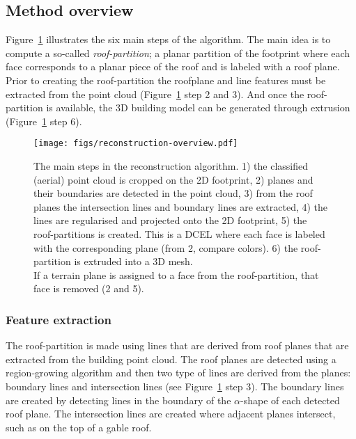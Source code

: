 \subsection{Method overview}
Figure~\ref{fig:method-overview} illustrates the six main steps of the algorithm. The main idea is to compute a so-called \emph{roof-partition}; a planar partition of the footprint where each face corresponds to a planar piece of the roof and is labeled with a roof plane. Prior to creating the roof-partition the roofplane and line features must be extracted from the point cloud (Figure~\ref{fig:method-overview} step 2 and 3). And once the roof-partition is available, the 3D building model can be generated through extrusion (Figure~\ref{fig:method-overview} step 6).
\begin{figure}
	\centering
	\texttt{[image: figs/reconstruction-overview.pdf]}
	\caption{The main steps in the reconstruction algorithm. 1) the classified (aerial) point cloud is cropped on the 2D footprint, 2) planes and their boundaries are detected in the point cloud, 3) from the roof planes the intersection lines and boundary lines are extracted, 4) the lines are regularised and projected onto the 2D footprint, 5) the roof-partitions is created. This is a DCEL where each face is labeled with the corresponding plane (from 2, compare colors). 6) the roof-partition is extruded into a 3D mesh. \\If a terrain plane is assigned to a face from the roof-partition, that face is removed (2 and 5).}%
	\label{fig:method-overview}
\end{figure}


\subsubsection{Feature extraction}
The roof-partition is made using lines that are derived from roof planes that are extracted from the building point cloud.
The roof planes are detected using a region-growing algorithm and then two type of lines are derived from the planes: boundary lines and intersection lines (see Figure~\ref{fig:method-overview} step 3).
The boundary lines are created by detecting lines in the boundary of the $\alpha$-shape of each detected roof plane.
The intersection lines are created where adjacent planes intersect, such as on the top of a gable roof.

